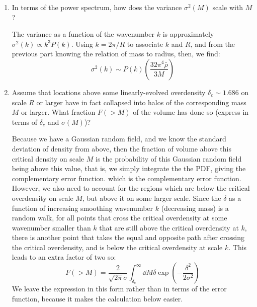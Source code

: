 \begin{enumerate}
\begin{enumerate}
\item In terms of the power spectrum, how does the variance
$\sigma^2(M)$ scale with $M$?
\begin{answer}
The variance as a function of the wavenumber $k$ is approximately
$\sigma^2(k) \propto k^3 P(k)$. Using $k=2\pi/R$ to associate $k$ and
$R$, and from the previous part knowing the relation of mass to
radius, then, we find:
\begin{equation}
    \sigma^2(k) \sim P(k)
    \left(\frac{32\pi^4\bar{\rho}}{3M}\right)
\end{equation}
\end{answer}
\item Assume that locations above some linearly-evolved
overdensity $\delta_c \sim 1.686$ on scale $R$ or larger have in fact
collapsed into halos of the corresponding mass $M$ or larger. What
fraction $F(>M)$ of the volume has done so (express in terms of $\delta_c$ and
$\sigma(M)$)?
\begin{answer}
    Because we have a Gaussian random field, and we know the standard
    deviation of density from above, then the fraction of volume above
    this critical density on scale $M$ is the probability of this
    Gaussian random field being above this value, that is, we simply
    integrate the the PDF, giving the complementary error function.
    which is the complementary error function. However, we also need
    to account for the regions which are below the critical overdensity on
    scale $M$, but above it on some larger scale. Since the $\delta$
    as a function of increasing smoothing wavenumber $k$ (decreasing
    mass) is a random walk, for all points that cross the critical
    overdensity at some wavenumber smaller than $k$ that are still above
    the critical overdensity at $k$, there is another point that takes the
    equal and opposite path after crossing the critical overdensity, and
    is below the critical overdensity at scale $k$. This leads to an
    extra factor of two so:
    \begin{equation}
        F(>M)
    = \frac{2}{\sqrt{2\pi}\sigma}\int^\infty_{\delta_c}\dd{M} \delta \exp\left(-\frac{\delta^2}{2\sigma^2}\right)
    \end{equation}
    We leave the expression in this form rather than in terms of the
    error function, because it makes the calculation below easier.
\end{answer}


\end{enumerate}
\end{enumerate}
